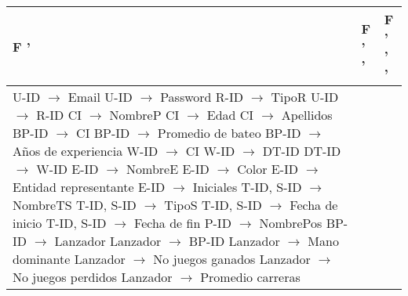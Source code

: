 \documentclass{report}
\begin{document}
    \begin{tabularx}{\textwidth}{|X|X|X|}
        \toprule
        \hfil F ' & \hfil F ' '  & \hfil F ' ' '  \\
        \midrule
        U-ID $\rightarrow$ Email \newline 
        U-ID $\rightarrow$ Password \newline 
        R-ID $\rightarrow$ TipoR \newline 
        U-ID $\rightarrow$ R-ID \newline 
        CI $\rightarrow$ NombreP \newline 
        CI $\rightarrow$ Edad \newline 
        CI $\rightarrow$ Apellidos \newline 
        BP-ID $\rightarrow$ CI \newline 
        BP-ID $\rightarrow$ Promedio de bateo \newline 
        BP-ID $\rightarrow$ Años de experiencia \newline 
        W-ID $\rightarrow$ CI \newline 
        W-ID $\rightarrow$ DT-ID \newline 
        DT-ID $\rightarrow$ W-ID \newline 
        E-ID $\rightarrow$ NombreE \newline 
        E-ID $\rightarrow$ Color \newline 
        E-ID $\rightarrow$ Entidad representante \newline 
        E-ID $\rightarrow$ Iniciales \newline 
        T-ID, S-ID $\rightarrow$ NombreTS \newline 
        T-ID, S-ID $\rightarrow$ TipoS \newline 
        T-ID, S-ID $\rightarrow$ Fecha de inicio \newline 
        T-ID, S-ID $\rightarrow$ Fecha de fin \newline 
        P-ID $\rightarrow$ NombrePos \newline 
        BP-ID $\rightarrow$ Lanzador \newline 
        Lanzador $\rightarrow$ BP-ID \newline 
        Lanzador $\rightarrow$ Mano dominante \newline 
        Lanzador $\rightarrow$ No juegos ganados \newline 
        Lanzador $\rightarrow$ No juegos perdidos \newline 
        Lanzador $\rightarrow$ Promedio carreras \newline 

\end{tabularx}
\end{document}
